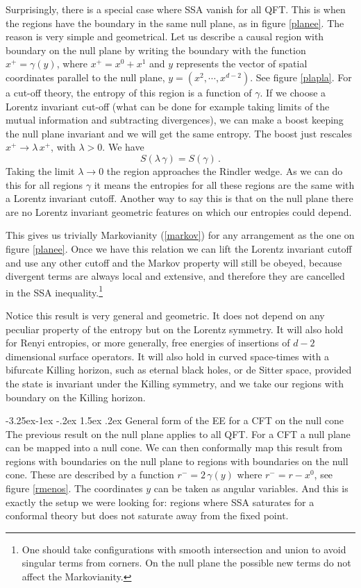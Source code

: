 \documentclass[11pt]{article}
\makeatletter
\renewcommand\subsection{\@startsection{subsection}{2}{\z@}%
                                   {-3.25ex\@plus -1ex \@minus -.2ex}%
                                     {1.5ex \@plus .2ex}%
                                     {\normalfont\bfseries}}
\numberwithin{equation}{section}
\newcommand{\be}{\begin{equation}}
\newcommand{\ee}{\end{equation}}
\makeatother
\begin{document}
Surprisingly, there is a special case where SSA vanish for all QFT. This is when the regions have the boundary in the same null plane, as in figure \ref{planee}.   
 The reason is very simple and geometrical. Let us describe a causal region with boundary on the null plane by writing the boundary with the function $x^+=\gamma(y)$, where $x^+=x^0+x^1$ and $y$ represents the vector of spatial coordinates parallel to the null plane, $y=(x^2,\cdots,x^{d-2})$. See figure \ref{plapla}. For a cut-off theory, the entropy of this region is a function of $\gamma$. If we choose a Lorentz invariant cut-off (what can be done for example taking limits of the mutual information and subtracting divergences), we can make a boost keeping the null plane invariant and we will get the same entropy. The boost just rescales $x^+\rightarrow \lambda\, x^+$, with $\lambda>0$. We have
 \be
 S(\lambda \,\gamma)=S(\gamma)\,.
\ee 
Taking the limit $\lambda\rightarrow 0$ the region approaches the Rindler wedge. As we can do this for all regions $\gamma$ it means the entropies for all these regions are the same with a Lorentz invariant cutoff. Another way to say this is that on the null plane there are no Lorentz invariant geometric features on which our entropies could depend. 

This gives us trivially Markovianity (\ref{markov}) for any arrangement as the one on figure \ref{planee}. Once we have this relation we can lift the Lorentz invariant cutoff and use any other cutoff and the Markov property will still be obeyed, because divergent terms are always local and extensive, and therefore they are cancelled in the SSA inequality.\footnote{One should take configurations with smooth intersection and union to avoid singular terms from corners. On the null plane the possible new terms do not affect the Markovianity.}  

Notice this result is very general and geometric. It does not depend on any peculiar property of the entropy but on the Lorentz symmetry. It will also hold for Renyi entropies, or more generally, free energies of insertions of $d-2$ dimensional surface operators. It will also hold in curved space-times with a bifurcate Killing horizon, such as eternal black holes, or de Sitter space, provided the state is invariant under the Killing symmetry, and we take our regions with boundary on the Killing horizon.   




\subsection{General form of the EE for a CFT on the null cone}
The previous result on the null plane applies to all QFT. For a CFT a null plane can be mapped into a null cone. We can then conformally map this result from regions with boundaries on the null plane to regions with boundaries on the null cone. These are described by a function $r^-=2 \,\gamma(y)$ where $r^-=r-x^0$, see figure \ref{rmenos}. The coordinates $y$ can be taken as angular variables. 
 And this is exactly the setup we were looking for: regions where SSA saturates for a conformal theory but does not saturate away from the fixed point. 
\end{document}

